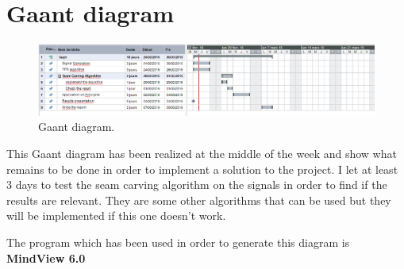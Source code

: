 \chapter*{Gaant diagram}

\begin{figure}[H]
\centering
    \includegraphics[scale=0.6,angle=0]{Images/GaantV1.PNG}
    \caption{Gaant diagram.}
    \label{fig:GaantV1}
\end{figure}

This Gaant diagram has been realized at the middle of the week and show what remains to be done in order to implement a solution to the project. I let at least 3 days to test the seam carving algorithm on the signals in order to find if the results are relevant. They are some other algorithms that can be used but they will be implemented if this one doesn't work.

The program which has been used in order to generate this diagram is \textbf{MindView 6.0}